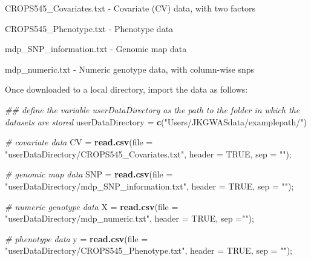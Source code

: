 \documentclass[
]{article}
\newenvironment{Shaded}{\begin{snugshade}}{\end{snugshade}}
\newcommand{\CommentTok}[1]{\textcolor[rgb]{0.56,0.35,0.01}{\textit{#1}}}
\newcommand{\DataTypeTok}[1]{\textcolor[rgb]{0.13,0.29,0.53}{#1}}
\newcommand{\KeywordTok}[1]{\textcolor[rgb]{0.13,0.29,0.53}{\textbf{#1}}}
\newcommand{\NormalTok}[1]{#1}
\newcommand{\OtherTok}[1]{\textcolor[rgb]{0.56,0.35,0.01}{#1}}
\newcommand{\StringTok}[1]{\textcolor[rgb]{0.31,0.60,0.02}{#1}}
\begin{document}
\textbullet CROPS545\_Covariates.txt - Covariate (CV) data, with two
factors

\par

\textbullet CROPS545\_Phenotype.txt - Phenotype data

\par

\textbullet mdp\_SNP\_information.txt - Genomic map data

\par

\textbullet mdp\_numeric.txt - Numeric genotype data, with column-wise
snps

\par

Once downloaded to a local directory, import the data as follows:

\begin{Shaded}
\begin{Highlighting}[]
\CommentTok{\#\# define the variable userDataDirectory as the path to the folder in which the datasets are stored}
\NormalTok{userDataDirectory =}\StringTok{ }\KeywordTok{c}\NormalTok{(}\StringTok{"Users/JKGWASdata/examplepath/"}\NormalTok{)}

\CommentTok{\# covariate data}
\NormalTok{CV =}\StringTok{ }\KeywordTok{read.csv}\NormalTok{(}\DataTypeTok{file =} \StringTok{"userDataDirectory/CROPS545\_Covariates.txt"}\NormalTok{, }\DataTypeTok{header =} \OtherTok{TRUE}\NormalTok{, }\DataTypeTok{sep =} \StringTok{""}\NormalTok{);}

\CommentTok{\# genomic map data}
\NormalTok{SNP =}\StringTok{ }\KeywordTok{read.csv}\NormalTok{(}\DataTypeTok{file =} \StringTok{"userDataDirectory/mdp\_SNP\_information.txt"}\NormalTok{, }\DataTypeTok{header =} \OtherTok{TRUE}\NormalTok{, }\DataTypeTok{sep =} \StringTok{""}\NormalTok{);}

\CommentTok{\# numeric genotype data}
\NormalTok{X =}\StringTok{ }\KeywordTok{read.csv}\NormalTok{(}\DataTypeTok{file =} \StringTok{"userDataDirectory/mdp\_numeric.txt"}\NormalTok{, }\DataTypeTok{header =} \OtherTok{TRUE}\NormalTok{, }\DataTypeTok{sep =}\StringTok{""}\NormalTok{);}

\CommentTok{\# phenotype data}
\NormalTok{y =}\StringTok{ }\KeywordTok{read.csv}\NormalTok{(}\DataTypeTok{file =} \StringTok{"userDataDirectory/CROPS545\_Phenotype.txt"}\NormalTok{, }\DataTypeTok{header =} \OtherTok{TRUE}\NormalTok{, }\DataTypeTok{sep =} \StringTok{""}\NormalTok{);}
\end{Highlighting}
\end{Shaded}
\end{document}
